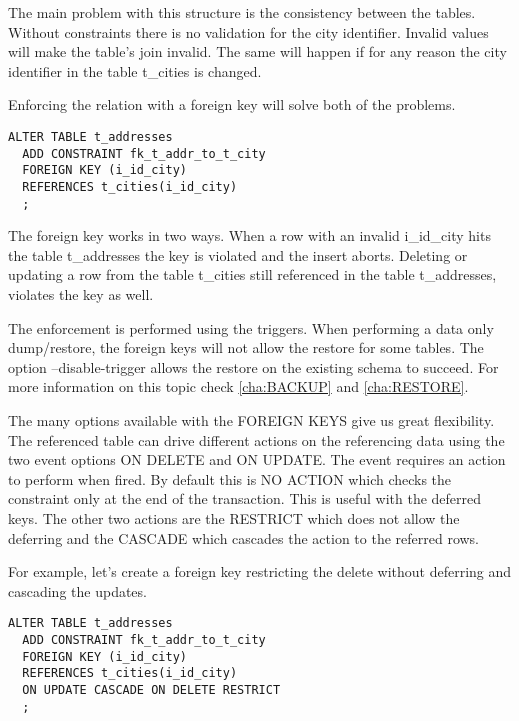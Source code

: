 The main problem with this structure is the consistency between the tables. Without constraints
there is no validation for the city identifier. Invalid values will make the table's join invalid. The
same will happen if for any reason the city identifier in the table t\_cities is changed.\newline

Enforcing the relation with a foreign key will solve both of the problems.

\begin{lstlisting}[style=pgsql]
ALTER TABLE t_addresses 
  ADD CONSTRAINT fk_t_addr_to_t_city
  FOREIGN KEY (i_id_city)
  REFERENCES t_cities(i_id_city)
  ;

\end{lstlisting}

The foreign key works in two ways. When a row with an invalid i\_id\_city hits the table t\_addresses 
the key is violated and the insert aborts. Deleting or updating a row from the table t\_cities still
referenced in the table t\_addresses, violates the key as well.\newline

The enforcement is performed using the triggers. When performing a data only dump/restore, the
foreign keys will not allow the restore for some tables. The option --disable-trigger allows the restore
on the existing schema to succeed. For more information on this topic check \ref{cha:BACKUP}
and \ref{cha:RESTORE}.\newline

The many options available with the FOREIGN KEYS give us great flexibility. The referenced table can
drive different actions on the referencing data using the two event options ON DELETE and ON UPDATE. The event requires an action to perform when
fired. By default this is NO ACTION which checks the constraint only at the end of the transaction. This
is useful with the deferred keys. The other two actions are the RESTRICT which does not allow the
deferring and  the CASCADE which cascades the action to the referred rows. 

For example, let's create a foreign key restricting the delete without deferring and cascading the
updates.

\begin{lstlisting}[style=pgsql]
ALTER TABLE t_addresses 
  ADD CONSTRAINT fk_t_addr_to_t_city
  FOREIGN KEY (i_id_city)
  REFERENCES t_cities(i_id_city)
  ON UPDATE CASCADE ON DELETE RESTRICT
  ;

\end{lstlisting}


